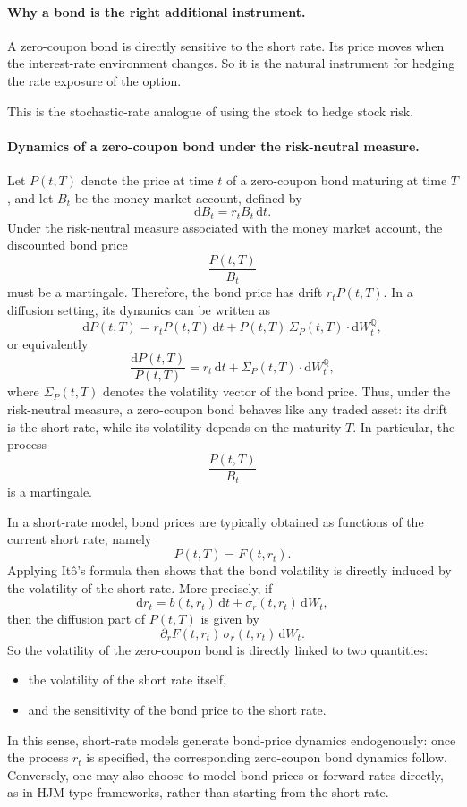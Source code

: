 \documentclass[11pt]{article}
\newcommand{\Qbb}{\mathbb{Q}}
\theoremstyle{plain}
\theoremstyle{definition}
\theoremstyle{remark}
\begin{document}
\paragraph{Why a bond is the right additional instrument.}
A zero-coupon bond is directly sensitive to the short rate.
Its price moves when the interest-rate environment changes.
So it is the natural instrument for hedging the rate exposure of the
option.

This is the stochastic-rate analogue of using the stock to hedge stock
risk.

\paragraph{Dynamics of a zero-coupon bond under the risk-neutral measure.}
Let \(P(t,T)\) denote the price at time \(t\) of a zero-coupon bond
maturing at time \(T\), and let \(B_t\) be the money market account,
defined by
\[
\mathrm{d}B_t=r_t B_t\,\mathrm{d}t.
\]
Under the risk-neutral measure associated with the money market account,
the discounted bond price
\[
\frac{P(t,T)}{B_t}
\]
must be a martingale. Therefore, the bond price has drift
\(r_tP(t,T)\). In a diffusion setting, its dynamics can be written as
\[
\mathrm{d}P(t,T)
=
r_t P(t,T)\,\mathrm{d}t
+
P(t,T)\,\Sigma_P(t,T)\cdot \mathrm{d}W_t^{\Qbb},
\]
or equivalently
\[
\frac{\mathrm{d}P(t,T)}{P(t,T)}
=
r_t\,\mathrm{d}t
+
\Sigma_P(t,T)\cdot \mathrm{d}W_t^{\Qbb},
\]
where \(\Sigma_P(t,T)\) denotes the volatility vector of the bond price.
Thus, under the risk-neutral measure, a zero-coupon bond behaves like
any traded asset: its drift is the short rate, while its volatility
depends on the maturity \(T\). In particular, the process
\[
\frac{P(t,T)}{B_t}
\]
is a martingale.

In a short-rate model, bond prices are typically obtained as functions
of the current short rate, namely
\[
P(t,T)=F(t,r_t).
\]
Applying It\^o's formula then shows that the bond volatility is directly
induced by the volatility of the short rate. More precisely, if
\[
\mathrm{d}r_t=b(t,r_t)\,\mathrm{d}t+\sigma_r(t,r_t)\,\mathrm{d}W_t,
\]
then the diffusion part of \(P(t,T)\) is given by
\[
\partial_r F(t,r_t)\,\sigma_r(t,r_t)\,\mathrm{d}W_t.
\]
So the volatility of the zero-coupon bond is directly linked to two
quantities:
\begin{itemize}[leftmargin=1.4em]
    \item the volatility of the short rate itself,
    \item and the sensitivity of the bond price to the short rate.
\end{itemize}
In this sense, short-rate models generate bond-price dynamics
endogenously: once the process \(r_t\) is specified, the corresponding
zero-coupon bond dynamics follow. Conversely, one may also choose to
model bond prices or forward rates directly, as in HJM-type frameworks,
rather than starting from the short rate.
\end{document}
